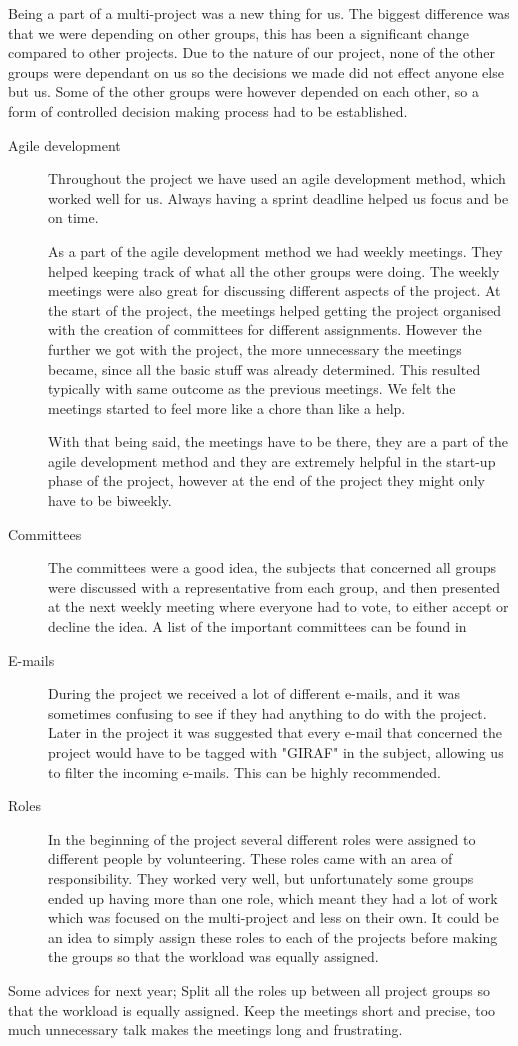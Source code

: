 Being a part of a multi-project was a new thing for us. The biggest difference was that we were depending on other groups, this has been a significant change compared to other projects. Due to the nature of our project, none of the other groups were dependant on us so the decisions we made did not effect anyone else but us. Some of the other groups were however depended on each other, so a form of controlled decision making process had to be established. 

\begin{description}
\item[Agile development] Throughout the project we have used an agile development method, which worked well for us. Always having a sprint deadline helped us focus and be on time. 

As a part of the agile development method we had weekly meetings. They helped keeping track of what all the other groups were doing. The weekly meetings were also great for discussing different aspects of the project. At the start of the project, the meetings helped getting the project organised with the creation of committees for different assignments. However the further we got with the project, the more unnecessary the meetings became, since all the basic stuff was already determined. This resulted typically with same outcome as the previous meetings. We felt the meetings started to feel more like a chore than like a help. 

With that being said, the meetings have to be there, they are a part of the agile development method and they are extremely helpful in the start-up phase of the project, however at the end of the project they might only have to be biweekly. 

\item[Committees] The committees were a good idea, the subjects that concerned all groups were discussed with a representative from each group, and then presented at the next weekly meeting where everyone had to vote, to either accept or decline the idea. A list of the important committees can be found in 

\item[E-mails] During the project we received a lot of different e-mails, and it was sometimes confusing to see if they had anything to do with the project. Later in the project it was suggested that every e-mail that concerned the project would have to be tagged with "GIRAF" in the subject, allowing us to filter the incoming e-mails. This can be highly recommended. 

\item[Roles] In the beginning of the project several different roles were assigned to different people by volunteering. These roles came with an area of responsibility. They worked very well, but unfortunately some groups ended up having more than one role, which meant they had a lot of work which was focused on the multi-project and less on their own. It could be an idea to simply assign these roles to each of the projects before making the groups so that the workload was equally assigned. 
\end{description}

Some advices for next year; Split all the roles up between all project groups so that the workload is equally assigned. Keep the meetings short and precise, too much unnecessary talk makes the meetings long and frustrating. 